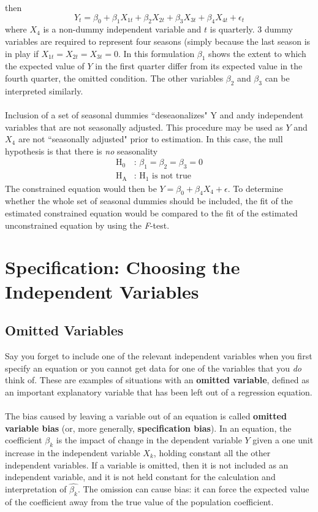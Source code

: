 \documentclass[11pt]{article}
\begin{document}
then
\begin{equation}
Y_t = \beta_0 + \beta_1X_{1t} + \beta_2X_{2t} + \beta_3X_{3t} + \beta_4X_{4t} + \epsilon_{t} \label{eg5_19}
\end{equation}
where $X_4$ is a non-dummy independent variable and $t$ is quarterly. 3 dummy variables are required to represent four seasons (simply because the last season is in play if $X_{1t}=X_{2t}=X_{3t}=0$. In this formulation $\beta_1$ shows the extent to which the expected value of $Y$ in the first quarter differ from its expected value in the fourth quarter, the omitted condition. The other variables $\beta_2$ and $\beta_3$ can be interpreted similarly.\\ \\
Inclusion of a set of seasonal dummies ``deseaonalizes" Y and andy independent variables that are not seasonally adjusted. This procedure may be used as $Y$ and $X_4$ are not ``seasonally adjusted" prior to estimation. In this case, the null hypothesis is that there is \textit{no} seasonality
\begin{align*}
 \text{H}_0 & \text{: }\beta_1 = \beta_2 = \beta_3 = 0\\ \text{H}_\text{A} & \text{: } \text{H}_1 \text{ is not true}
\end{align*}
The constrained equation would then be $Y=\beta_0 + \beta_4X_4 + \epsilon$. To determine whether the whole set of seasonal dummies should be included, the fit of the estimated constrained equation would be compared to the fit of the estimated unconstrained equation by using the \textit{F}-test.
\clearpage
\section{Specification: Choosing the Independent Variables}
\subsection{Omitted Variables}
Say you forget to include one of the relevant independent variables when you first specify an equation or you cannot get data for one of the variables that you \textit{do} think of. These are examples of situations with an \textbf{omitted variable}, defined as an important explanatory variable that has been left out of a regression equation.\\ \\
The bias caused by leaving a variable out of an equation is called \textbf{omitted variable bias} (or, more generally, \textbf{specification bias}). In an equation, the coefficient $\beta_k$ is the impact of change in the dependent variable $Y$ given a one unit increase in the independent variable $X_k$, holding constant all the other independent variables. If a variable is omitted, then it is not included as an independent variable, and it is not held constant for the calculation and interpretation of $\hat{\beta_k}$. The omission can cause bias: it can force the expected value of the coefficient away from the true value of the population coefficient. \\ \\
\end{document}
